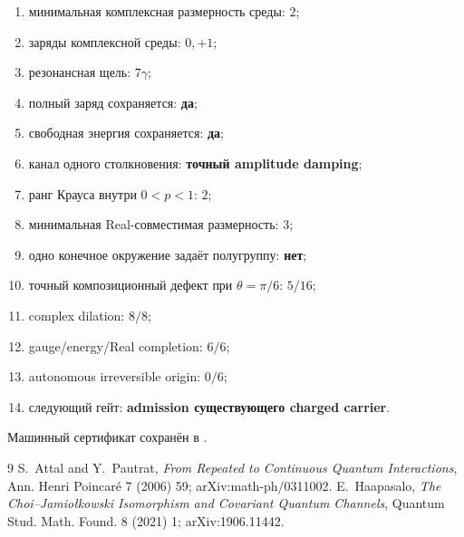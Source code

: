 \begin{protocol}\begin{enumerate}
\item минимальная комплексная размерность среды: \textbf{$2$};
\item заряды комплексной среды: \textbf{$0,+1$};
\item резонансная щель: \textbf{$7\gamma$};
\item полный заряд сохраняется: \textbf{да};
\item свободная энергия сохраняется: \textbf{да};
\item канал одного столкновения: \textbf{точный amplitude damping};
\item ранг Крауса внутри $0<p<1$: \textbf{$2$};
\item минимальная Real-совместимая размерность: \textbf{$3$};
\item одно конечное окружение задаёт полугруппу: \textbf{нет};
\item точный композиционный дефект при $\theta=\pi/6$: \textbf{$5/16$};
\item complex dilation: \textbf{$8/8$};
\item gauge/energy/Real completion: \textbf{$6/6$};
\item autonomous irreversible origin: \textbf{$0/6$};
\item следующий гейт: \textbf{admission существующего charged carrier}.
\end{enumerate}\end{protocol}

Машинный сертификат сохранён в
.

\begin{thebibliography}{9}
 S.~Attal and Y.~Pautrat,
\emph{From Repeated to Continuous Quantum Interactions},
Ann. Henri Poincar\'e 7 (2006) 59; arXiv:math-ph/0311002.
 E.~Haapasalo,
\emph{The Choi--Jamio\l{}kowski Isomorphism and Covariant Quantum Channels},
Quantum Stud. Math. Found. 8 (2021) 1; arXiv:1906.11442.
\end{thebibliography}